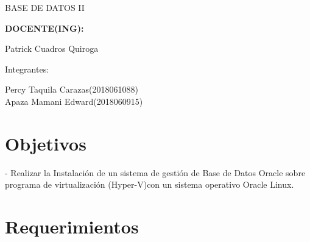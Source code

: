 \documentclass[12pt,letterpaper]{article}
\begin{document}
\begin{titlepage}
\begin{center}
\vspace*{0.1in}
\begin{large}
BASE DE DATOS II\\
\end{large}

\vspace*{0.3in}
\begin{Large}
\textbf{DOCENTE(ING):} \\
\end{Large}

\vspace*{0.1in}
\begin{large}
 Patrick Cuadros Quiroga\\
\end{large}

\vspace*{0.2in}
\vspace*{0.1in}
\begin{large}
Integrantes: \\
\begin{flushleft}
Percy Taquila Carazas\hfill	(2018061088) \\
Apaza Mamani Edward\hfill	(2018060915) \\
\end{flushleft}
\end{large}
\end{center}

\end{titlepage}

\tableofcontents %
\thispagestyle{empty} %
\newpage
\setcounter{page}{1} %


\section{Objetivos} 

\begin{itemize}
- Realizar la Instalación de un sistema de gestión de Base de Datos Oracle sobre programa de virtualización (Hyper-V)con un sistema operativo Oracle Linux.\\
\end{itemize} 


\section{Requerimientos} 
\end{document}

